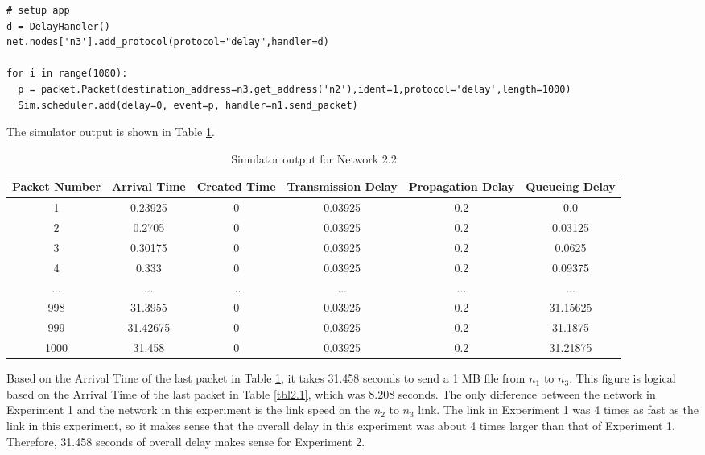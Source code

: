 \documentclass[11pt]{article}
\begin{document}
\begin{description}
\begin{lstlisting}[caption={Network 2.2},label=sec2exp2]
# setup app
d = DelayHandler()
net.nodes['n3'].add_protocol(protocol="delay",handler=d)

for i in range(1000):
  p = packet.Packet(destination_address=n3.get_address('n2'),ident=1,protocol='delay',length=1000)
  Sim.scheduler.add(delay=0, event=p, handler=n1.send_packet)
\end{lstlisting}

The simulator output is shown in Table \ref{tbl2.2}.

\smallskip

\begin{table}[H]
\begin{center}
\caption{Simulator output for Network 2.2}
\label{tbl2.2}
\begin{tabular}{cccccc}
  \toprule
  Packet Number & Arrival Time & Created Time & Transmission Delay & Propagation Delay & Queueing Delay\\
  \midrule
  1 & 0.23925 & 0 & 0.03925 & 0.2 & 0.0\\
  2 & 0.2705 & 0 & 0.03925 & 0.2 & 0.03125\\
  3 & 0.30175 & 0 & 0.03925 & 0.2 & 0.0625\\
  4 & 0.333 & 0 & 0.03925 & 0.2 & 0.09375\\
  ... & ... & ... & ... & ... & ...\\
  998 & 31.3955 & 0 & 0.03925 & 0.2 & 31.15625\\
  999 & 31.42675 & 0 & 0.03925 & 0.2 & 31.1875\\
  1000 & 31.458 & 0 & 0.03925 & 0.2 & 31.21875\\
  \bottomrule
\end{tabular}
\end{center}
\end{table}

\smallskip

Based on the Arrival Time of the last packet in Table \ref{tbl2.2}, it takes 31.458 seconds to send a 1 MB file from $n_1$ to $n_3$. This figure is logical based on the Arrival Time of the last packet in Table \ref{tbl2.1}, which was 8.208 seconds. The only difference between the network in Experiment 1 and the network in this experiment is the link speed on the $n_2$ to $n_3$ link. The link in Experiment 1 was 4 times as fast as the link in this experiment, so it makes sense that the overall delay in this experiment was about 4 times larger than that of Experiment 1. Therefore, 31.458 seconds of overall delay makes sense for Experiment 2.
\end{description}
\end{document}
